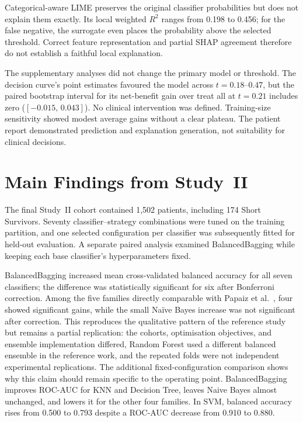 Categorical-aware LIME preserves the original classifier probabilities but does not explain them exactly. Its local weighted $R^2$ ranges from 0.198 to 0.456; for the false negative, the surrogate even places the probability above the selected threshold. Correct feature representation and partial SHAP agreement therefore do not establish a faithful local explanation.

The supplementary analyses did not change the primary model or threshold. The decision curve's point estimates favoured the model across $t=0.18$--$0.47$, but the paired bootstrap interval for its net-benefit gain over treat all at $t=0.21$ includes zero ($[-0.015,\,0.043]$). No clinical intervention was defined. Training-size sensitivity showed modest average gains without a clear plateau. The patient report demonstrated prediction and explanation generation, not suitability for clinical decisions.

\section{Main Findings from Study~II}
\label{sec:conclusion_study2}

The final Study~II cohort contained 1,502 patients, including 174 Short Survivors. Seventy classifier--strategy combinations were tuned on the training partition, and one selected configuration per classifier was subsequently fitted for held-out evaluation. A separate paired analysis examined BalancedBagging while keeping each base classifier's hyperparameters fixed.

BalancedBagging increased mean cross-validated balanced accuracy for all seven classifiers; the difference was statistically significant for six after Bonferroni correction. Among the five families directly comparable with Papaiz et al.~\cite{Papaiz2024}, four showed significant gains, while the small Naïve Bayes increase was not significant after correction. This reproduces the qualitative pattern of the reference study but remains a partial replication: the cohorts, optimisation objectives, and ensemble implementation differed, Random Forest used a different balanced ensemble in the reference work, and the repeated folds were not independent experimental replications.
The additional fixed-configuration comparison shows why this claim should remain specific to the operating point. BalancedBagging improves ROC-AUC for KNN and Decision Tree, leaves Naive Bayes almost unchanged, and lowers it for the other four families. In SVM, balanced accuracy rises from 0.500 to 0.793 despite a ROC-AUC decrease from 0.910 to 0.880.

